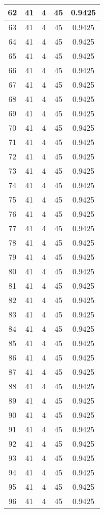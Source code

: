 \documentclass[letterpaper, 12pt]{article}
\begin{document}
\begin{longtable}{|c|c|c|c|c|}
\hline
62 & 41 & 4 & 45 & 0.9425 \\
\hline
63 & 41 & 4 & 45 & 0.9425 \\
\hline
64 & 41 & 4 & 45 & 0.9425 \\
\hline
65 & 41 & 4 & 45 & 0.9425 \\
\hline
66 & 41 & 4 & 45 & 0.9425 \\
\hline
67 & 41 & 4 & 45 & 0.9425 \\
\hline
68 & 41 & 4 & 45 & 0.9425 \\
\hline
69 & 41 & 4 & 45 & 0.9425 \\
\hline
70 & 41 & 4 & 45 & 0.9425 \\
\hline
71 & 41 & 4 & 45 & 0.9425 \\
\hline
72 & 41 & 4 & 45 & 0.9425 \\
\hline
73 & 41 & 4 & 45 & 0.9425 \\
\hline
74 & 41 & 4 & 45 & 0.9425 \\
\hline
75 & 41 & 4 & 45 & 0.9425 \\
\hline
76 & 41 & 4 & 45 & 0.9425 \\
\hline
77 & 41 & 4 & 45 & 0.9425 \\
\hline
78 & 41 & 4 & 45 & 0.9425 \\
\hline
79 & 41 & 4 & 45 & 0.9425 \\
\hline
80 & 41 & 4 & 45 & 0.9425 \\
\hline
81 & 41 & 4 & 45 & 0.9425 \\
\hline
82 & 41 & 4 & 45 & 0.9425 \\
\hline
83 & 41 & 4 & 45 & 0.9425 \\
\hline
84 & 41 & 4 & 45 & 0.9425 \\
\hline
85 & 41 & 4 & 45 & 0.9425 \\
\hline
86 & 41 & 4 & 45 & 0.9425 \\
\hline
87 & 41 & 4 & 45 & 0.9425 \\
\hline
88 & 41 & 4 & 45 & 0.9425 \\
\hline
89 & 41 & 4 & 45 & 0.9425 \\
\hline
90 & 41 & 4 & 45 & 0.9425 \\
\hline
91 & 41 & 4 & 45 & 0.9425 \\
\hline
92 & 41 & 4 & 45 & 0.9425 \\
\hline
93 & 41 & 4 & 45 & 0.9425 \\
\hline
94 & 41 & 4 & 45 & 0.9425 \\
\hline
95 & 41 & 4 & 45 & 0.9425 \\
\hline
96 & 41 & 4 & 45 & 0.9425 \\

\end{longtable}
\end{document}
